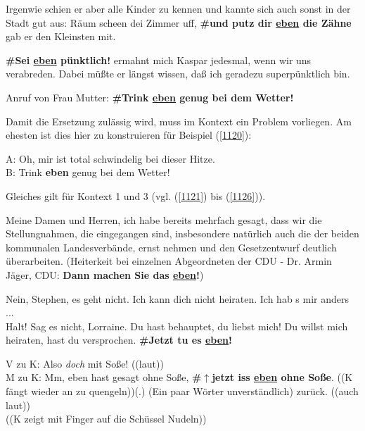 {\begin{exe}
	\ex\label{1117} 
	\scriptsize
	Irgenwie schien er aber alle Kinder zu kennen und kannte sich auch sonst in der Stadt gut aus: \glqq Räum scheen dei Zimmer uff, \textbf{\#und putz dir 	\underline{eben} die Zähne}\grqq{} gab er den Kleinsten mit. 
\end{exe}	
		
\begin{exe}
	\ex\label{1118} 
	\scriptsize
	\glqq \textbf{\#Sei \underline{eben} pünktlich!}\grqq{} ermahnt mich Kaspar jedesmal, wenn wir uns verabreden. Dabei müßte er längst wissen, daß ich 		geradezu superpünktlich bin. 
\end{exe}		

\begin{exe}
	\ex\label{1119} 
	Anruf von Frau Mutter: \glqq \textbf{\#Trink \underline{eben} genug bei dem Wetter!}\grqq{}
\end{exe}	
Damit die Ersetzung zulässig wird, muss im Kontext ein Problem vorliegen. Am ehesten ist dies hier zu konstruieren für Beispiel (\ref{1120}):

\begin{exe}
	\ex\label{1120} 
	A: Oh, mir ist total schwindelig bei dieser Hitze.\\
	B: Trink \textbf{eben} genug bei dem Wetter!
\end{exe}	
Gleiches gilt für Kontext 1 und 3 (vgl. (\ref{1121}) bis (\ref{1126})).

\begin{exe}
	\ex\label{1121} 
	\scriptsize
 	Meine Damen und Herren, ich habe bereits mehrfach gesagt, dass wir die Stellungnahmen, die eingegangen sind, insbesondere natürlich auch die der beiden 	kommunalen Landesverbände, ernst nehmen und den Gesetzentwurf deutlich überarbeiten. (Heiterkeit bei einzelnen Abgeordneten der CDU - Dr. Armin Jäger, 		CDU: \textbf{Dann machen Sie das \underline{eben}!}) 	
\end{exe}

\begin{exe}
	\ex\label{1122} 
	\scriptsize
 	 \glqq Nein, Stephen, es geht nicht. Ich kann dich nicht heiraten. Ich hab s mir anders ...\grqq{}\\
	\glqq Halt! Sag es nicht, Lorraine. Du hast behauptet, du liebst mich! Du willst mich heiraten, hast du versprochen. \textbf{\#Jetzt tu es 					\underline{eben}!}\grqq{} 	
\end{exe}	

\begin{exe}
	\ex\label{1123} 
	\scriptsize
 	V zu K: Also \textit{doch} mit Soße! ((laut))\\
	M zu K: Mm, eben hast gesagt \glqq ohne Soße\grqq{}, \textbf{\#$\uparrow$jetzt iss \underline{eben} ohne Soße}. ((K fängt wieder an zu quengeln))(.) 		(Ein paar Wörter unverständlich) zurück. ((auch laut))\\
	((K zeigt mit Finger auf die Schüssel Nudeln))	
\end{exe}

}
